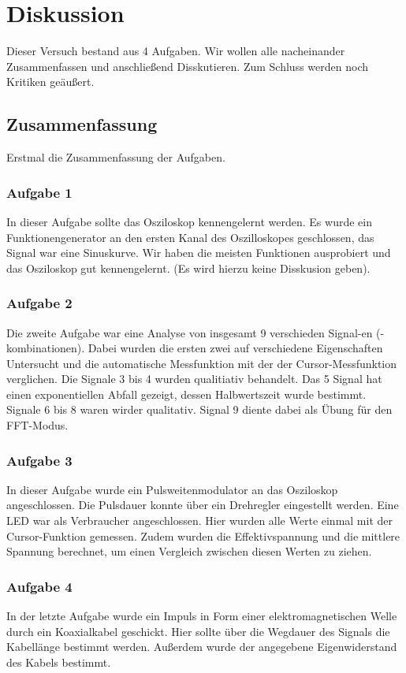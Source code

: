 \chapter{Diskussion}
Dieser Versuch bestand aus 4 Aufgaben. Wir wollen alle nacheinander Zusammenfassen und anschließend Disskutieren. Zum Schluss werden noch Kritiken geäußert.
\section{Zusammenfassung}
Erstmal die Zusammenfassung der Aufgaben.
\subsection*{Aufgabe 1}
In dieser Aufgabe sollte das Osziloskop kennengelernt werden. Es wurde ein Funktionengenerator an den ersten Kanal des Oszilloskopes geschlossen, das Signal war eine Sinuskurve. Wir haben die meisten Funktionen ausprobiert und das Osziloskop gut kennengelernt. (Es wird hierzu keine Disskusion geben).

\subsection*{Aufgabe 2}
Die zweite Aufgabe war eine Analyse von insgesamt 9 verschieden Signal-en (-kombinationen). Dabei wurden die ersten zwei auf verschiedene Eigenschaften Untersucht und die automatische Messfunktion mit der der Cursor-Messfunktion verglichen.
Die Signale 3 bis 4 wurden qualitiativ behandelt. Das 5 Signal hat einen exponentiellen Abfall gezeigt, dessen Halbwertszeit wurde bestimmt. 
Signale 6 bis 8 waren wirder qualitativ. Signal 9 diente dabei als Übung für den FFT-Modus.

\subsection*{Aufgabe 3}
In dieser Aufgabe wurde ein Pulsweitenmodulator an das Osziloskop angeschlossen. Die Pulsdauer konnte über ein Drehregler eingestellt werden. Eine LED war als Verbraucher angeschlossen.
Hier wurden alle Werte einmal mit der Cursor-Funktion gemessen. Zudem wurden die Effektivspannung und die mittlere Spannung berechnet, um einen Vergleich zwischen diesen Werten zu ziehen.

\subsection*{Aufgabe 4}
In der letzte Aufgabe wurde ein Impuls in Form einer elektromagnetischen Welle durch ein Koaxialkabel geschickt. Hier sollte über die Wegdauer des Signals die Kabellänge bestimmt werden. 
Außerdem wurde der angegebene Eigenwiderstand des Kabels bestimmt.

